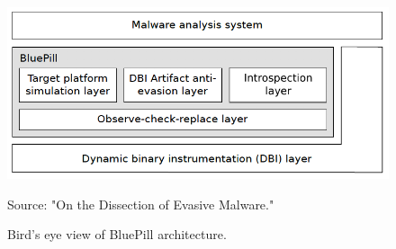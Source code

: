 \documentclass[LaM,binding=0.6cm]{sapthesis}
\newcommand{\source}[1]{\caption*{Source: {#1}} }
\begin{document}
\begin{figure}[h!]
\centering
\includegraphics[scale=.6]{images/techn8}
\caption{Bird's eye view of BluePill architecture.}
\source{"On the Dissection of Evasive Malware."}
\end{figure}
\end{document}

